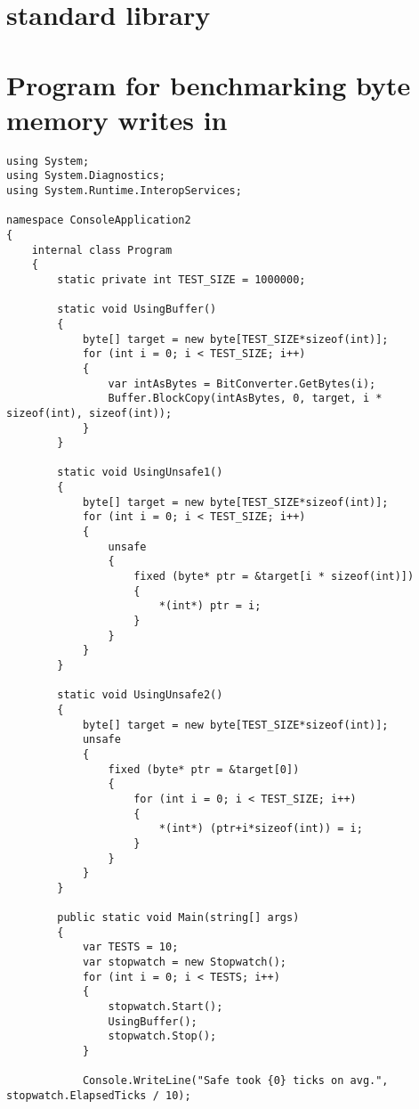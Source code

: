 \begin{appendices}
\chapter{\fshark{} standard library}
\label{appendix:soacs}




\chapter{Program for benchmarking byte memory writes in \csharp{}}
\begin{verbatim}
using System;
using System.Diagnostics;
using System.Runtime.InteropServices;

namespace ConsoleApplication2
{
    internal class Program
    {
        static private int TEST_SIZE = 1000000;
        
        static void UsingBuffer()
        {
            byte[] target = new byte[TEST_SIZE*sizeof(int)];
            for (int i = 0; i < TEST_SIZE; i++)
            {
                var intAsBytes = BitConverter.GetBytes(i);
                Buffer.BlockCopy(intAsBytes, 0, target, i * sizeof(int), sizeof(int)); 
            }
        }
        
        static void UsingUnsafe1()
        {
            byte[] target = new byte[TEST_SIZE*sizeof(int)];
            for (int i = 0; i < TEST_SIZE; i++)
            {
                unsafe
                {
                    fixed (byte* ptr = &target[i * sizeof(int)])
                    {
                        *(int*) ptr = i;
                    }
                }
            }
        }
        
        static void UsingUnsafe2()
        {
            byte[] target = new byte[TEST_SIZE*sizeof(int)];
            unsafe
            {
                fixed (byte* ptr = &target[0])
                {
                    for (int i = 0; i < TEST_SIZE; i++)
                    {
                        *(int*) (ptr+i*sizeof(int)) = i;
                    }
                }
            }
        }

        public static void Main(string[] args)
        {
            var TESTS = 10;
            var stopwatch = new Stopwatch();
            for (int i = 0; i < TESTS; i++)
            {
                stopwatch.Start();
                UsingBuffer();
                stopwatch.Stop();
            }

            Console.WriteLine("Safe took {0} ticks on avg.", stopwatch.ElapsedTicks / 10);


\end{verbatim}
\end{appendices}
